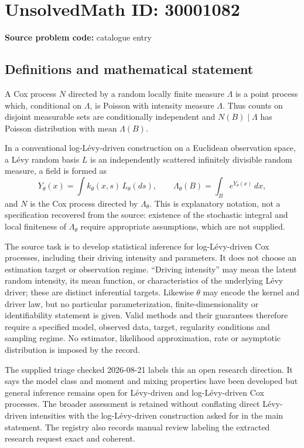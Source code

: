 \documentclass[11pt]{article}
\begin{document}
\section*{UnsolvedMath ID: 30001082}
\textbf{Source problem code:} catalogue entry
\subsection{Definitions and mathematical statement}
A Cox process $N$ directed by a random locally finite measure $\Lambda$ is a point process which, conditional on $\Lambda$, is Poisson with intensity measure $\Lambda$. Thus counts on disjoint measurable sets are conditionally independent and $N(B)\mid\Lambda$ has Poisson distribution with mean $\Lambda(B)$.

In a conventional log-Lévy-driven construction on a Euclidean observation space, a Lévy random basis $L$ is an independently scattered infinitely divisible random measure, a field is formed as
\[
Y_\theta(x)=\int k_\theta(x,s)\,L_\theta(ds),\qquad
\Lambda_\theta(B)=\int_B e^{Y_\theta(x)}\,dx,
\]
and $N$ is the Cox process directed by $\Lambda_\theta$. This is explanatory notation, not a specification recovered from the source: existence of the stochastic integral and local finiteness of $\Lambda_\theta$ require appropriate assumptions, which are not supplied.

The source task is to develop statistical inference for log-Lévy-driven Cox processes, including their driving intensity and parameters. It does not choose an estimation target or observation regime. ``Driving intensity'' may mean the latent random intensity, its mean function, or characteristics of the underlying Lévy driver; these are distinct inferential targets. Likewise $\theta$ may encode the kernel and driver law, but no particular parameterization, finite-dimensionality or identifiability statement is given. Valid methods and their guarantees therefore require a specified model, observed data, target, regularity conditions and sampling regime. No estimator, likelihood approximation, rate or asymptotic distribution is imposed by the record.

The supplied triage checked 2026-08-21 labels this an open research direction. It says the model class and moment and mixing properties have been developed but general inference remains open for Lévy-driven and log-Lévy-driven Cox processes. The broader assessment is retained without conflating direct Lévy-driven intensities with the log-Lévy-driven construction asked for in the main statement. The registry also records manual review labeling the extracted research request exact and coherent.
\end{document}
